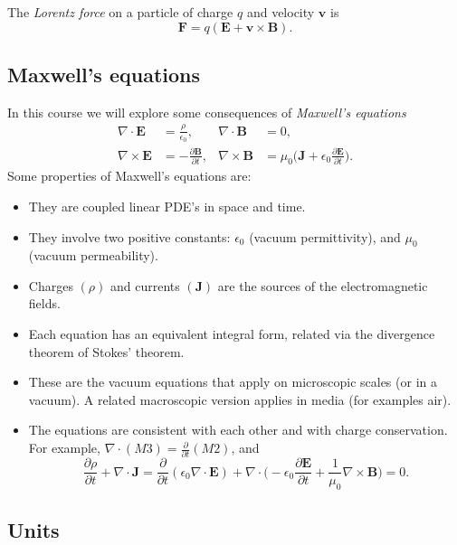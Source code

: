 \documentclass[12pt]{article}
\begin{document}
The \emph{Lorentz force} on a particle of charge $q$ and velocity $\mathbf{v}$ is
\[
\mathbf{F} = q(\mathbf{E} + \mathbf{v} \times \mathbf{B})
.\]

\subsection{Maxwell's equations}
\label{sub:maxwells_equations}

In this course we will explore some consequences of \emph{Maxwell's equations}
\begin{align*}
	\nabla \cdot \mathbf{E} &= \frac{\rho}{\epsilon_0}, & \nabla \cdot \mathbf{B} &= 0, \\
	\nabla \times \mathbf{E} &= - \frac{\partial \mathbf{B}}{\partial t}, & \nabla \times \mathbf{B} &= \mu_0 \biggl( \mathbf{J} + \epsilon_0 \frac{\partial \mathbf{E}}{\partial t} \biggr).
\end{align*}
Some properties of Maxwell's equations are:
\begin{itemize}
	\item They are coupled linear PDE's in space and time.
	\item They involve two positive constants: $\epsilon_0$ (vacuum permittivity), and $\mu_0$ (vacuum permeability).
	\item Charges $(\rho)$ and currents $(\mathbf{J})$ are the sources of the electromagnetic fields.
	\item Each equation has an equivalent integral form, related via the divergence theorem of Stokes' theorem.
	\item These are the vacuum equations that apply on microscopic scales (or in a vacuum). A related macroscopic version applies in media (for examples air).
	\item The equations are consistent with each other and with charge conservation. For example, $\nabla \cdot (M3) = \frac{\partial}{\partial t}(M2)$, and
		\[
		\frac{\partial \rho}{\partial t} + \nabla \cdot \mathbf{J} = \frac{\partial}{\partial t} (\epsilon_0 \nabla \cdot \mathbf{E}) + \nabla \cdot \biggl(- \epsilon_0 \frac{\partial \mathbf{E}}{\partial t} + \frac{1}{\mu_0} \nabla \times \mathbf{B} \biggr) = 0
		.\]
\end{itemize}

\subsection{Units}
\label{sub:units}
\end{document}
